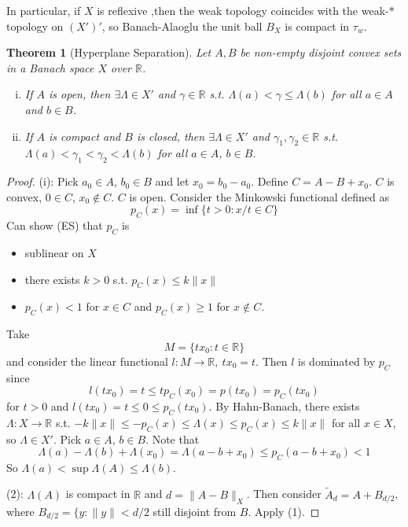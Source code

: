 \documentclass{article}
\theoremstyle{definition}
\theoremstyle{remark}
\theoremstyle{plain}
\newtheorem{thm}[defn]{Theorem}
\newcommand{\RR}{\mathbb{R}}
\begin{document}
In particular, if $X$ is reflexive ,then the weak topology coincides with the weak-$\ast$ topology on $(X')'$, so Banach-Alaoglu the unit ball $B_X$ is compact in $\tau_w$.
\begin{thm}[Hyperplane Separation]
    Let $A,B$ be non-empty disjoint convex sets in a Banach space $X$ over $\RR$.
    \begin{enumerate}[(i)]
        \item If $A$ is open, then $\exists\Lambda\in X'$ and $\gamma\in\RR$ s.t. $\Lambda(a)<\gamma\le \Lambda(b)$ for all $a\in A$ and $b\in B$.
        \item If $A$ is compact and $B$ is closed, then $\exists\Lambda\in X'$ and $\gamma_1,\gamma_2\in\RR$ s.t. $\Lambda(a)<\gamma_1<\gamma_2<\Lambda(b)$ for all $a\in A$, $b\in B$.
    \end{enumerate}
\end{thm}
\begin{proof}
    (i): Pick $a_0\in A$, $b_0\in B$ and let $x_0=b_0-a_0$. Define $C=A-B+x_0$. $C$ is convex, $0\in C$, $x_0\notin C$. $C$ is open. Consider the Minkowski functional defined as 
    \[p_C(x)=\inf\{t>0:x/t\in C\}\]
    Can show (ES) that $p_C$ is 
    \begin{itemize}
        \item sublinear on $X$
        \item there exists $k>0$ s.t. $p_C(x)\le k\|x\|$
        \item $p_C(x)<1$ for $x\in C$ and $p_C(x)\ge 1$ for $x\notin C$.
    \end{itemize}
     Take $$M=\{tx_0:t\in\RR\}$$ and consider the linear functional $l:M\to\RR,\ tx_0=t$. Then $l$ is dominated by $p_C$ since 
     \[l(tx_0)=t\le tp_C(x_0)=p(tx_0)=p_C(tx_0)\]
     for $t>0$ and $l(tx_0)=t\le 0\le p_C(tx_0)$. By Hahn-Banach, there exists $\Lambda:X\to\RR$ s.t. $-k\|x\|\le -p_C(x)\le \Lambda(x)\le p_C(x)\le k\|x\|$ for all $x\in X$, so $\Lambda\in X'$. Pick $a\in A$, $b\in B$. Note that \[\Lambda(a)-\Lambda(b)+\Lambda(x_0)=\Lambda(a-b+x_0)\le p_C(a-b+x_0)<1\]
     So $\Lambda(a)<\sup\Lambda(A)\le \Lambda(b)$.

     (2): $\Lambda(A)$ is compact in $\RR$ and $d=\|A-B\|_X$. Then consider $\tilde A_d=A+B_{d/2}$, where $B_{d/2}=\{y:\|y\|<d/2$ still disjoint from $B$. Apply (1).
\end{proof}
\end{document}
